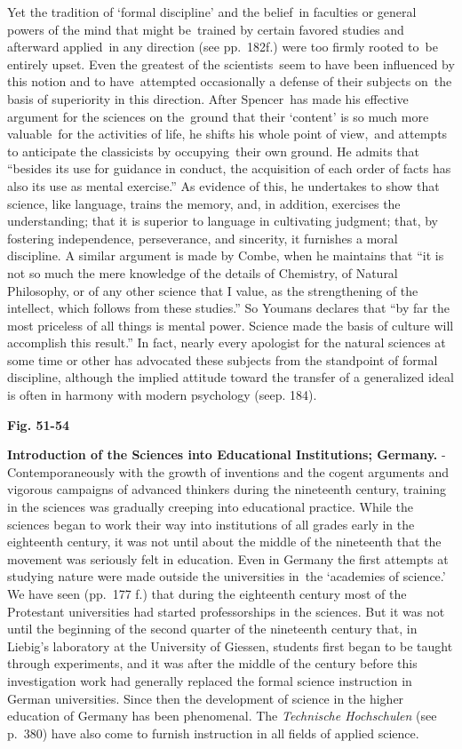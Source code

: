 \documentclass[]{book}
\begin{document}
Yet the tradition of `formal discipline' and the belief~in faculties or general powers of the mind that might be~trained by certain favored studies and afterward applied~in any direction (see pp.~182f.) were too firmly rooted to~be entirely upset. Even the greatest of the scientists~seem to have been influenced by this notion and to have~attempted occasionally a defense of their subjects on~the basis of superiority in this direction. After Spencer~has made his effective argument for the sciences on the~ground that their `content' is so much more valuable~for the activities of life, he shifts his whole point of view,~and attempts to anticipate the classicists by occupying~their own ground. He admits that ``besides its use for guidance in conduct, the acquisition of each order of facts has also its use as mental exercise.'' As evidence of this, he undertakes to show that science, like language, trains the memory, and, in addition, exercises the understanding; that it is superior to language in cultivating judgment; that, by fostering independence, perseverance, and sincerity, it furnishes a moral discipline. A similar argument is made by Combe, when he maintains that ``it is not so much the mere knowledge of the details of Chemistry, of Natural Philosophy, or of any other science that I value, as the strengthening of the intellect, which follows from these studies.'' So Youmans declares that ``by far the most priceless of all things is mental power. Science made the basis of culture will accomplish this result.'' In fact, nearly every apologist for the natural sciences at some time or other has advocated these subjects from the standpoint of formal discipline, although the implied attitude toward the transfer of a generalized ideal is often in harmony with modern psychology (seep. 184).

\textbf{Fig. 51-54}

\textbf{Introduction of the Sciences into Educational Institutions; Germany.} - Contemporaneously with the growth of inventions and the cogent arguments and vigorous campaigns of advanced thinkers during the nineteenth century, training in the sciences was gradually creeping into educational practice. While the sciences began to work their way into institutions of all grades early in the eighteenth century, it was not until about the middle of the nineteenth that the movement was seriously felt in education. Even in Germany the first attempts at studying nature were made outside the universities in~the `academies of science.' We have seen (pp.~177 f.) that during the eighteenth century most of the Protestant universities had started professorships in the sciences. But it was not until the beginning of the second quarter of the nineteenth century that, in Liebig's laboratory at the University of Giessen, students first began to be taught through experiments, and it was after the middle of the century before this investigation work had generally replaced the formal science instruction in German universities. Since then the development of science in the higher education of Germany has been phenomenal. The \emph{Technische Hochschulen} (see p.~380) have also come to furnish instruction in all fields of applied science.
\end{document}
